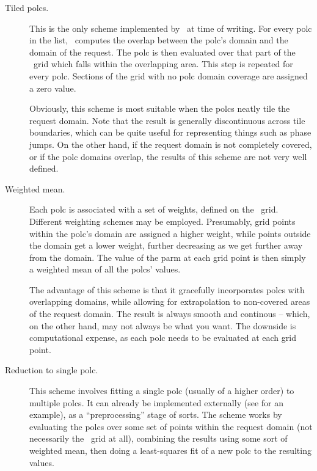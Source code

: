 \documentclass[10pt,twoside]{book}
\begin{document}
  \begin{description}

  \item[Tiled polcs.] This is the only scheme implemented by \Parm\ at time of
  writing. For every polc in the list, \Parm\ computes the overlap between
  the polc's domain and the domain of the request. The polc is then evaluated
  over that part of the \Cells\ grid which falls within the overlapping area.
  This step is repeated for every polc. Sections of the grid with no polc
  domain coverage are assigned a zero value.

  Obviously, this scheme is most suitable when the polcs neatly tile
  the request domain. Note that the result is generally discontinuous across
  tile boundaries, which can be quite useful for representing things such as
  phase jumps. On the other  hand, if the request domain is not completely
  covered, or if the polc domains overlap, the results of this scheme are not
  very well defined. 

  \item[Weighted mean.] Each polc is associated with a set of weights, defined
  on the \Cells\ grid. Different weighting schemes may be employed. Presumably,
  grid points within the polc's domain are assigned a higher weight, while
  points outside the domain get a lower weight, further decreasing as we get
  further away from the domain. The value of the parm at each grid point is
  then simply a weighted mean of all the polcs' values.

  The advantage of this scheme is that it gracefully incorporates polcs with
  overlapping domains, while allowing for extrapolation to non-covered areas of
  the request domain. The result is always smooth and continous -- which, on the
  other hand, may not always be what you want. The downside is computational
  expense, as each polc needs to be evaluated at each grid point.

  \item[Reduction to single polc.] This scheme involves fitting a single polc
  (usually of a higher order) to multiple polcs. It can already be implemented
  externally (see  for an example), as a ``preprocessing''
  stage of sorts. The scheme works by evaluating the polcs over some set of
  points within the request domain (not necessarily the \Cells\ grid at all),
  combining the results using some sort of weighted mean, then doing a
  least-squares fit of a new polc to the resulting values.

  \end{description}
\end{document}
